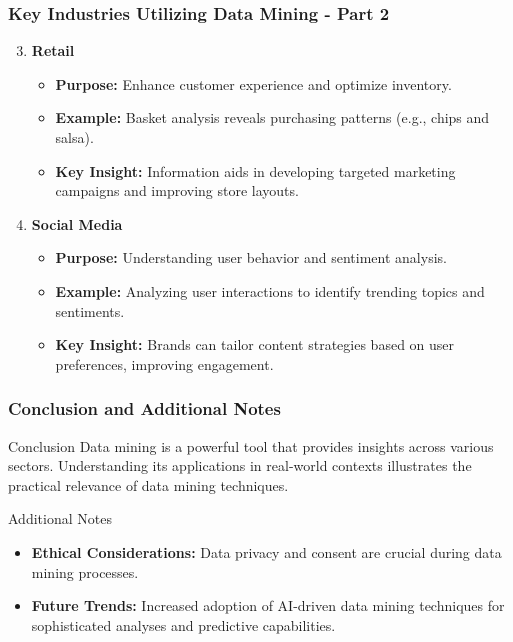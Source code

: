 \documentclass[aspectratio=169]{beamer}
\begin{document}
\begin{frame}[fragile]
    \frametitle{Key Industries Utilizing Data Mining - Part 2}
    \begin{enumerate}
        \setcounter{enumi}{2} %
        \item \textbf{Retail}
        \begin{itemize}
            \item \textbf{Purpose:} Enhance customer experience and optimize inventory.
            \item \textbf{Example:} Basket analysis reveals purchasing patterns (e.g., chips and salsa).
            \item \textbf{Key Insight:} Information aids in developing targeted marketing campaigns and improving store layouts.
        \end{itemize}
        
        \item \textbf{Social Media}
        \begin{itemize}
            \item \textbf{Purpose:} Understanding user behavior and sentiment analysis.
            \item \textbf{Example:} Analyzing user interactions to identify trending topics and sentiments.
            \item \textbf{Key Insight:} Brands can tailor content strategies based on user preferences, improving engagement.
        \end{itemize}
    \end{enumerate}
\end{frame}

\begin{frame}[fragile]
    \frametitle{Conclusion and Additional Notes}
    \begin{block}{Conclusion}
        Data mining is a powerful tool that provides insights across various sectors. Understanding its applications in real-world contexts illustrates the practical relevance of data mining techniques.
    \end{block}
    
    \begin{block}{Additional Notes}
        \begin{itemize}
            \item \textbf{Ethical Considerations:} Data privacy and consent are crucial during data mining processes.
            \item \textbf{Future Trends:} Increased adoption of AI-driven data mining techniques for sophisticated analyses and predictive capabilities.
        \end{itemize}
    \end{block}
\end{frame}
\end{document}

